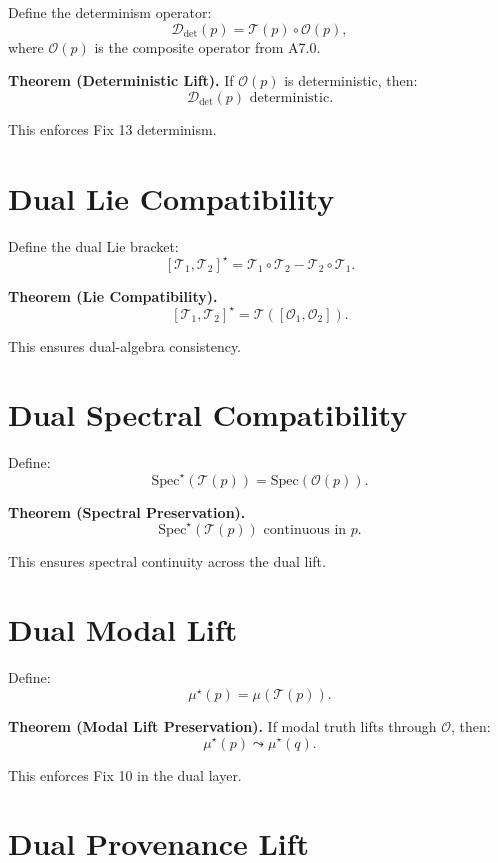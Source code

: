 \documentclass[11pt]{article}
\begin{document}
Define the determinism operator:
\[
\mathcal{D}_{\mathrm{det}}(p) = \mathcal{T}(p) \circ \mathcal{O}(p),
\]
where $\mathcal{O}(p)$ is the composite operator from A7.0.

\textbf{Theorem (Deterministic Lift).}
If $\mathcal{O}(p)$ is deterministic, then:
\[
\mathcal{D}_{\mathrm{det}}(p) \text{ deterministic}.
\]

This enforces Fix 13 determinism.

\section{Dual Lie Compatibility}

Define the dual Lie bracket:
\[
[\mathcal{T}_1, \mathcal{T}_2]^\star =
\mathcal{T}_1 \circ \mathcal{T}_2
-
\mathcal{T}_2 \circ \mathcal{T}_1.
\]

\textbf{Theorem (Lie Compatibility).}
\[
[\mathcal{T}_1, \mathcal{T}_2]^\star
=
\mathcal{T}([ \mathcal{O}_1, \mathcal{O}_2 ]).
\]

This ensures dual-algebra consistency.

\section{Dual Spectral Compatibility}

Define:
\[
\mathrm{Spec}^\star(\mathcal{T}(p))
=
\mathrm{Spec}(\mathcal{O}(p)).
\]

\textbf{Theorem (Spectral Preservation).}
\[
\mathrm{Spec}^\star(\mathcal{T}(p))
\text{ continuous in } p.
\]

This ensures spectral continuity across the dual lift.

\section{Dual Modal Lift}

Define:
\[
\mu^\star(p) = \mu(\mathcal{T}(p)).
\]

\textbf{Theorem (Modal Lift Preservation).}
If modal truth lifts through $\mathcal{O}$, then:
\[
\mu^\star(p) \leadsto \mu^\star(q).
\]

This enforces Fix 10 in the dual layer.

\section{Dual Provenance Lift}
\end{document}

